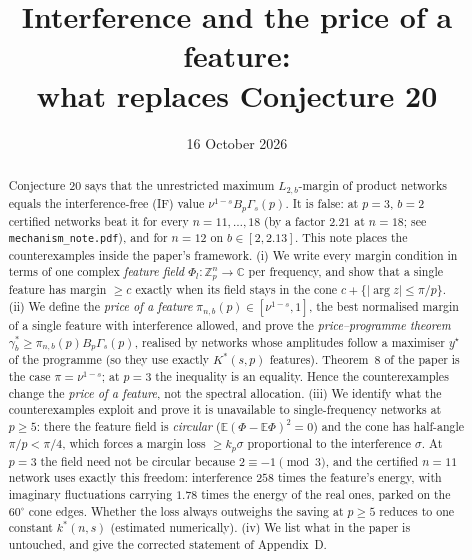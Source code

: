 \documentclass[11pt]{article}
\title{Interference and the price of a feature:\\ what replaces Conjecture 20}
\author{}
\date{16 October 2026}
\theoremstyle{definition}
\newcommand{\E}{\mathbb{E}}
\begin{document}
\maketitle

\begin{abstract}
Conjecture 20 says that the unrestricted maximum $L_{2,b}$-margin of product networks equals the
interference-free (IF) value $\nu^{1-s}B_p\Gamma_s(p)$.  It is false: at $p=3$, $b=2$ certified networks beat it for
every $n=11,\dots,18$ (by a factor $2.21$ at $n=18$; see \texttt{mechanism\_note.pdf}), and for $n=12$ on
$b\in[2,2.13]$.  This note places the counterexamples inside the paper's framework.
(i) We write every margin condition in terms of one complex \emph{feature field} $\Phi_l:\mathbb Z_p^n\to\mathbb C$ per
frequency, and show that a single feature has margin $\ge c$ exactly when its field stays in the cone
$c+\{|\arg z|\le\pi/p\}$.
(ii) We define the \emph{price of a feature} $\pi_{n,b}(p)\in[\nu^{1-s},1]$, the best normalised margin of a single
feature with interference allowed, and prove the \emph{price--programme theorem}
$\gamma^*_b\ge\pi_{n,b}(p)B_p\Gamma_s(p)$, realised by networks whose amplitudes follow a maximiser $y^\star$
of the programme (so they use exactly $K^*(s,p)$ features).  Theorem~8 of the paper is the case
$\pi=\nu^{1-s}$; at $p=3$ the inequality is an equality.  Hence the counterexamples change the \emph{price of a feature},
not the spectral allocation.
(iii) We identify what the counterexamples exploit and prove it is unavailable to single-frequency networks at
$p\ge5$: there the feature field is \emph{circular} ($\E(\Phi-\E\Phi)^2=0$) and the cone has half-angle $\pi/p<\pi/4$,
which forces a margin loss $\ge k_p\sigma$ proportional to the interference $\sigma$.  At $p=3$ the field need not be
circular because $2\equiv-1\pmod 3$, and the certified $n=11$ network uses exactly this freedom: interference
$258$ times the feature's energy, with imaginary fluctuations carrying $1.78$ times the energy of the real ones, parked
on the $60^\circ$ cone edges.  Whether the loss always outweighs the saving at $p\ge5$ reduces to one constant
$k^*(n,s)$ (estimated numerically).
(iv) We list what in the paper is untouched, and give the corrected statement of Appendix~D.
\end{abstract}
\end{document}
